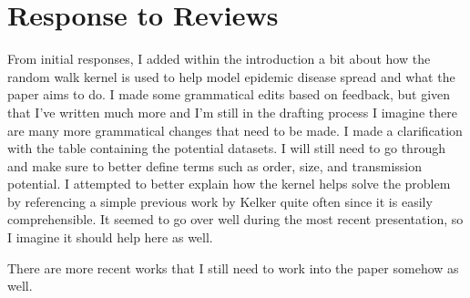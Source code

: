 \section{Response to Reviews}


From initial responses, I added within the introduction a bit about how the random walk kernel is used to help model epidemic disease spread and what the paper aims to do. I made some grammatical edits based on feedback, but given that I've written much more and I'm still in the drafting process I imagine there are many more grammatical changes that need to be made. I made a clarification with the table containing the potential datasets. I will still need to go through and make sure to better define terms such as order, size, and transmission potential. 
I attempted to better explain how the kernel helps solve the problem by referencing a simple previous work by Kelker quite often since it is easily comprehensible. It seemed to go over well during the most recent presentation, so I imagine it should help here as well. 

There are more recent works that I still need to work into the paper somehow as well.